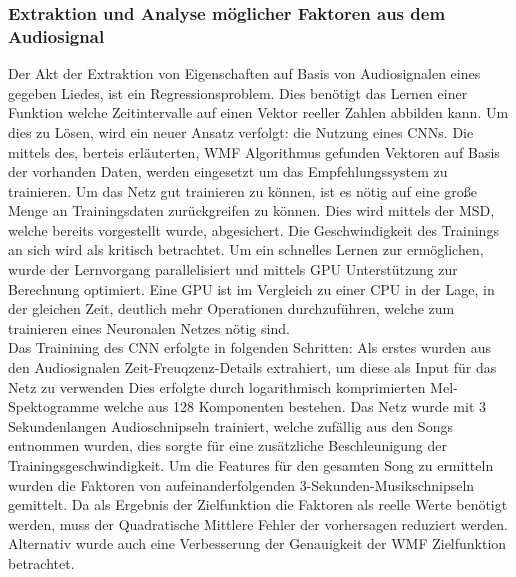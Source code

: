 \documentclass[twosided,a4,10pt]{article}
\begin{document}
\begin{multicols}{2}
		\subsubsection{Extraktion und Analyse möglicher Faktoren aus dem Audiosignal}
		Der Akt der Extraktion von Eigenschaften auf Basis von Audiosignalen eines gegeben Liedes, ist ein Regressionsproblem. Dies benötigt das Lernen einer Funktion welche Zeitintervalle auf einen Vektor reeller Zahlen abbilden kann. Um dies zu Lösen, wird ein neuer Ansatz verfolgt: die Nutzung eines CNNs. Die mittels des, berteis erläuterten, WMF Algorithmus gefunden Vektoren auf Basis der vorhanden Daten, werden eingesetzt um das Empfehlungssystem zu trainieren.
		Um das Netz gut trainieren zu können, ist es nötig auf eine große Menge an Trainingsdaten zurückgreifen zu können. Dies wird mittels der MSD, welche bereits vorgestellt wurde, abgesichert. 
		Die Geschwindigkeit des Trainings an sich wird als kritisch betrachtet. Um ein schnelles Lernen zur ermöglichen, wurde der Lernvorgang parallelisiert und mittels GPU Unterstützung zur Berechnung optimiert. Eine GPU ist im Vergleich zu einer CPU in der Lage, in der gleichen Zeit, deutlich mehr Operationen durchzuführen, welche zum trainieren eines Neuronalen Netzes nötig sind.\newline\\		
		Das Trainining des CNN erfolgte in folgenden Schritten: Als erstes wurden aus den Audiosignalen Zeit-Freuqzenz-Details extrahiert, um diese als Input für das Netz zu verwenden Dies erfolgte durch logarithmisch komprimierten Mel-Spektogramme welche aus 128 Komponenten bestehen. Das Netz wurde mit 3 Sekundenlangen Audioschnipseln trainiert, welche zufällig aus den Songs entnommen wurden, dies sorgte für eine zusätzliche Beschleunigung der Trainingsgeschwindigkeit. Um die Features für den gesamten Song zu ermitteln wurden die Faktoren von aufeinanderfolgenden 3-Sekunden-Musikschnipseln gemittelt. Da als Ergebnis der Zielfunktion die Faktoren als reelle Werte benötigt werden, muss der Quadratische Mittlere Fehler der vorhersagen reduziert werden. Alternativ wurde auch eine Verbesserung der Genauigkeit der WMF Zielfunktion betrachtet. \cite{oord}
		

\end{multicols}
\end{document}
